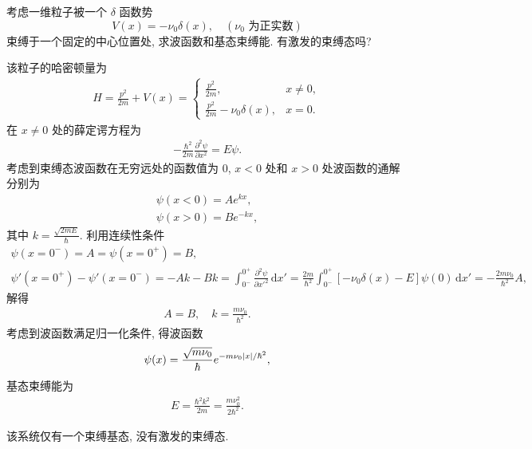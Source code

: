 \documentclass{assignment}
\begin{document}
\begin{prob}[课本习题 2.24]
    考虑一维粒子被一个 $\delta$ 函数势
    \[
        V(x)=-\nu_0\delta(x),\quad(\nu_0\text{ 为正实数})
    \]
    束缚于一个固定的中心位置处, 求波函数和基态束缚能. 有激发的束缚态吗?
\end{prob}
\begin{sol}
    该粒子的哈密顿量为
    \begin{align}
        H=\frac{p^2}{2m}+V(x)=\left\{\begin{array}{ll}
            \frac{p^2}{2m},&x\neq 0,\\
            \frac{p^2}{2m}-\nu_0\delta(x),&x=0.
        \end{array}\right.
    \end{align}
    在 $x\neq 0$ 处的薛定谔方程为
    \begin{align}
        -\frac{\hbar^2}{2m}\frac{\partial^2\psi}{\partial x^2}=E\psi.
    \end{align}
    考虑到束缚态波函数在无穷远处的函数值为 $0$, $x<0$ 处和 $x>0$ 处波函数的通解分别为
    \begin{align}
        \psi(x<0)=Ae^{kx},\\
        \psi(x>0)=Be^{-kx},
    \end{align}
    其中 $k=\frac{\sqrt{2mE}}{\hbar}$.
    利用连续性条件
    \begin{gather}
        \psi(x=0^-)=A=\psi(x=0^+)=B,\\
        \psi'(x=0^+)-\psi'(x=0^-)=-Ak-Bk=\int_{0^-}^{0^+}\frac{\partial^2\psi}{\partial x'^2}\,\mathrm{d}x'=\frac{2m}{\hbar^2}\int_{0^-}^{0^+}[-\nu_0\delta(x)-E]\psi(0)\,\mathrm{d}x'=-\frac{2m\nu_0}{\hbar^2}A,
    \end{gather}
    解得
    \begin{align}
        A=B,\quad k=\frac{m\nu_0}{\hbar^2}.
    \end{align}
    考虑到波函数满足归一化条件, 得波函数
    \begin{align}
        \psi(x)=\frac{\sqrt{m\nu_0}}{\hbar}e^{-m\nu_0\left\lvert x\right\rvert/\hbar^2},
    \end{align}
    基态束缚能为
    \begin{align}
        E=\frac{\hbar^2k^2}{2m}=\frac{m\nu_0^2}{2\hbar^2}.
    \end{align}

    该系统仅有一个束缚基态, 没有激发的束缚态.
\end{sol}
\end{document}
